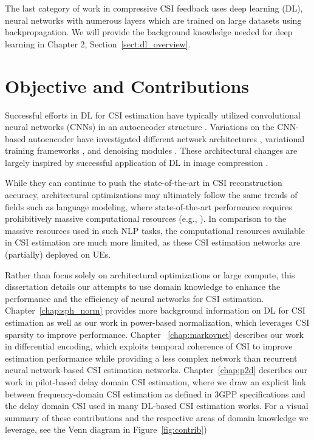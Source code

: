 The last category of work in compressive CSI feedback uses deep learning (DL), neural networks with numerous layers which are trained on large datasets using backpropagation. We will provide the background knowledge needed for deep learning in Chapter 2, Section~\ref{sect:dl_overview}.

\section{Objective and Contributions}

Successful efforts in DL for CSI estimation have typically utilized convolutional neural networks (CNNs) in an autoencoder structure \cite{ref:csinet}. Variations on the CNN-based autoencoder have investigated different network architectures \cite{ref:Lu2020CRNet}, variational training frameworks \cite{ref:Hussien2020PRVNet}, and denoising modules \cite{ref:Sun2020AnciNet}. These architectural changes are largely inspired by successful application of DL in image compression \cite{ref:szegedy2017inception,ref:balle2017end,ref:xie2012image}.

While they can continue to push the state-of-the-art in CSI reconstruction accuracy, architectural optimizations may ultimately follow the same trends of fields such as language modeling, where state-of-the-art performance requires prohibitively massive computational resources (e.g., \cite{ref:brown2020language}). In comparison to the massive resources used in such NLP tasks, the computational resources available in CSI estimation are much more limited, as these CSI estimation networks are (partially) deployed on UEs. 

Rather than focus solely on architectural optimizations or large compute, this dissertation details our attempts to use domain knowledge to enhance the performance and the efficiency of neural networks for CSI estimation. Chapter~\ref{chap:sph_norm} provides more background information on DL for CSI estimation as well as our work in power-based normalization, which leverages CSI sparsity to improve performance. Chapter ~\ref{chap:markovnet} describes our work in differential encoding, which exploits temporal coherence of CSI to improve estimation performance while providing a less complex network than recurrent neural network-based CSI estimation networks. Chapter~\ref{chap:p2d} describes our work in pilot-based delay domain CSI estimation, where we draw an explicit link between frequency-domain CSI estimation as defined in 3GPP specifications and the delay domain CSI used in many DL-based CSI estimation works. For a visual summary of these contributions and the respective areas of domain knowledge we leverage, see the Venn diagram in Figure~\ref{fig:contrib})


